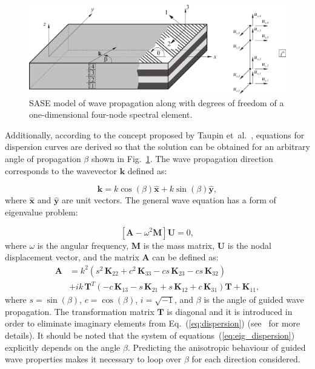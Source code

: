 \documentclass[preprint,12pt]{elsarticle}
\newcommand{\matr}[1]{\mathbf{#1}} %
\newcommand{\vect}[1]{\mathbf{#1}} %
\begin{document}
\begin{figure} [h!]
	\centering
	\includegraphics[width=\textwidth]{layered_composite_SASE4.png}
	\caption{SASE model of wave propagation along with degrees of freedom of a one-dimensional four-node spectral element.}
	\label{fig:layered_composite_SASE}
\end{figure}
	
Additionally, according to the concept proposed by Taupin et~al.~\cite{Taupin2011}, equations for dispersion curves are derived so that the solution can be obtained for an arbitrary angle of propagation $\beta$ shown in Fig.~\ref{fig:layered_composite_SASE}. 
The wave propagation direction corresponds to the wavevector $\vect{k}$ defined as:
	
\begin{equation}
	\vect{k} = k \cos (\beta)\hat{ \vect{x}} + k \sin (\beta) \hat{\vect{y}},
	\label{eq:wavevector}
\end{equation}
where \(\hat{ \vect{x}}\) and \(\hat{\vect{y}}\) are unit vectors. 	
The general wave equation has a form of eigenvalue problem:

\begin{equation}
	\left[\matr{A} - \omega^2\matr{M} \right] \vect{U} =0,
	\label{eq:eig_dispersion}
\end{equation}
where $\omega$ is the angular frequency, $\matr{M}$ is the mass matrix, $\matr{U}$ is the nodal displacement vector, and the matrix $\matr{A}$ can be defined as:
\begin{equation}
	\begin{aligned}
	\matr{A} & =  k^2\left(s^2 \,\matr{K}_{22} + c^2\, \matr{K}_{33} - c s\, \matr{K}_{23} - c s\, \matr{K}_{32}\right) \\
	& + i k\, \matr{T}^T\left(-c\, \matr{K}_{13} - s\, \matr{K}_{21} + s\, \matr{K}_{12} + c\, \matr{K}_{31}\right) \matr{T} +\matr{K}_{11},
	\end{aligned}
	\label{eq:dispersion}
\end{equation}
where  $s = \sin(\beta)$, $c = \cos(\beta)$, $i = \sqrt{-1}$, and $\beta$ is the angle of guided wave propagation. 
The transformation matrix $\matr{T}$ is diagonal and it is introduced in order to eliminate imaginary elements from Eq.~(\ref{eq:dispersion}) (see~\cite{Bartoli2006} for more details). 
It should be noted that the system of equations~(\ref{eq:eig_dispersion}) explicitly depends on the angle $\beta$. 
Predicting the anisotropic behaviour of guided wave properties makes it necessary to loop over $\beta$ for each direction considered.
	
\end{document}
